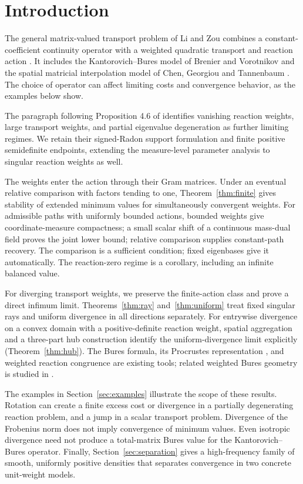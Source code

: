 \section{Introduction}
The general matrix-valued transport problem of Li and Zou combines a
constant-coefficient continuity operator with a weighted quadratic transport
and reaction action \cite{LiZou}. It includes the Kantorovich--Bures model of
Brenier and Vorotnikov \cite{BrenierVorotnikov} and the spatial matricial
interpolation model of Chen, Georgiou and Tannenbaum \cite{ChenGeorgiouTannenbaum}.
The choice of operator can affect limiting costs and convergence behavior,
as the examples below show.

The paragraph following Proposition 4.6 of \cite{LiZou} identifies vanishing
reaction weights, large transport weights, and partial eigenvalue degeneration
as further limiting regimes. We retain their signed-Radon support formulation
and finite positive semidefinite endpoints, extending the measure-level
parameter analysis to singular reaction weights as well.

The weights enter the action through their Gram matrices. Under an eventual
relative comparison with factors tending to one, Theorem~\ref{thm:finite}
gives stability of extended minimum values for simultaneously convergent
weights. For admissible paths with uniformly bounded actions, bounded weights give
coordinate-measure compactness; a small scalar shift of a continuous mass-dual
field proves the joint lower bound; relative comparison supplies constant-path
recovery. The comparison is a sufficient condition; fixed eigenbases give it
automatically. The reaction-zero
regime is a corollary, including an infinite balanced value.

For diverging transport weights, we preserve the finite-action class and prove a direct
infimum limit. Theorems~\ref{thm:ray} and~\ref{thm:uniform} treat fixed
singular rays and uniform divergence in all directions separately.
For entrywise divergence on a convex domain with a
positive-definite reaction weight, spatial aggregation and a three-part hub
construction identify the uniform-divergence limit explicitly
(Theorem~\ref{thm:hub}). The Bures formula,
its Procrustes representation \cite{BhatiaJainLim}, and weighted reaction
congruence \cite[Remark 3.11]{LiZou} are existing tools; related weighted
Bures geometry is studied in \cite{HanEtAl}.

The examples in Section~\ref{sec:examples} illustrate the scope of these
results. Rotation can create
a finite excess cost or divergence in a partially degenerating reaction
problem, and a jump in a scalar transport problem. Divergence of the Frobenius
norm does not imply convergence of minimum values. Even isotropic divergence
need not produce a total-matrix Bures value for the Kantorovich--Bures operator.
Finally, Section~\ref{sec:separation} gives a high-frequency family of smooth,
uniformly positive densities that separates convergence in two concrete
unit-weight models.

